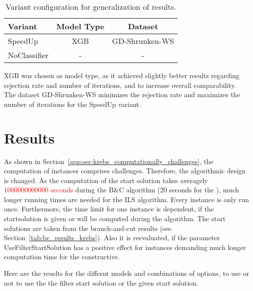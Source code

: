 \begin{table}[ht]
    \centering
    \small
    \begin{tabular}{l c c  }
        \toprule
        Variant      & Model Type & Dataset        \\
        \midrule
        SpeedUp      & XGB        & GD-Shrunken-WS \\
        NoClassifier & -          & -              \\
        \bottomrule
    \end{tabular}
    \caption{Variant configuration for generalization of \gendreauDataSetText results.}
    \label{tab:model_configuration_krebs}
\end{table}

\gls{XGB} was chosen as model type, as it achieved slightly better results
regarding rejection rate and number of iterations, and to increase overall comparability.
The dataset GD-Shrunken-WS minimizes the rejection rate and maximizes the number of iterations for the SpeedUp variant.

\section{Results}
\label{sec:results_krebs}
As shown in Section~\ref{app:sec:krebs_computationally_challenges}, the computation of \krebsADataSetText instances comprises
challenges. Therefore, the algorithmic design is changed. As the computation of the start solution takes averagely \textcolor{red}{1000000000000 seconds}
during the B\&C algorithm (20 seconds for the \gendreauDataSetText), much longer running times are needed for the \gls{ILS} algorithm.
Every instance is only run once. Furthermore, the time limit for one instance
is dependent, if the startsolution is given or will be computed during the algorithm. The start solutions are taken from the branch-and-cut
results (see Section~\ref{tab:bc_results_krebs}). Also it is reevaluated, if the parameter UseFilterStartSolution has a positive effect
for instances demanding much longer computation time for the constructive.



\parbreak
Here are the reuslts for the differnt models and combinations of options, to use or not to use the the filter start solution or the given start solution.

